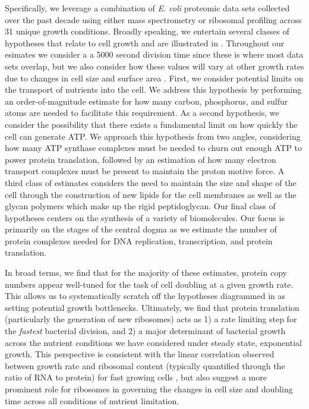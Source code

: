 Specifically, we leverage a combination of \textit{E. coli} proteomic data sets
collected over the past decade using either mass spectrometry
\citep{schmidt2016,peebo2015, valgepea2013} or ribosomal profiling
\citep{li2014} across 31 unique growth conditions. Broadly speaking, we
entertain several classes of hypotheses that relate to cell growth and are
illustrated in .  Throughout our esimates we consider a a 5000
second division time since these is where most data sets overlap, but we also
consider how these values will vary at other growth rates due to changes in cell
size and surface area \citep{taheriaraghi2015}. First, we consider potential
limits on the transport of nutrients into the cell. We address this hypothesis
by performing an order-of-magnitude estimate for how many carbon, phosphorus,
and sulfur atoms are needed to facilitate this requirement. As a second
hypothesis, we consider the possibility that there exists a fundamental limit on
how quickly the cell can generate ATP. We approach this hypothesis from two
angles, considering how many ATP synthase complexes must be needed to churn out
enough ATP to power protein translation, followed by an estimation of how many
electron transport complexes must be present to maintain the proton motive
force. A third class of estimates considers the need to maintain the size and
shape of the cell through the construction of new lipids for the cell membranes
as well as the glycan polymers which make up the rigid peptidoglycan. Our final
class of hypotheses centers on the synthesis of a variety of biomolecules. Our
focus is primarily on the stages of the central dogma as we estimate the number
of protein complexes needed for DNA replication, transcription, and protein
translation.

In broad terms, we find that for the majority of these estimates, protein copy numbers
appear well-tuned for the task of cell doubling at a given growth rate. This allows us to
systematically scratch off the hypotheses diagrammed in  as
setting potential growth bottlenecks. Ultimately, we find that protein
translation (particularly the generation of new ribosomes) acts as 1) a rate
limiting step for the \textit{fastest} bacterial division, and 2) a major
determinant of bacterial growth across the nutrient conditions we have
considered under steady state, exponential growth. This perspective is
consistent with the linear correlation observed between growth rate and
ribosomal content (typically quantified through the ratio of RNA to protein) for
fast growing cells \citep{bremer2008, scott2010}, but also suggest a more prominent role for
ribosomes in governing the changes in cell size and doubling time across all
conditions of nutrient limitation.

